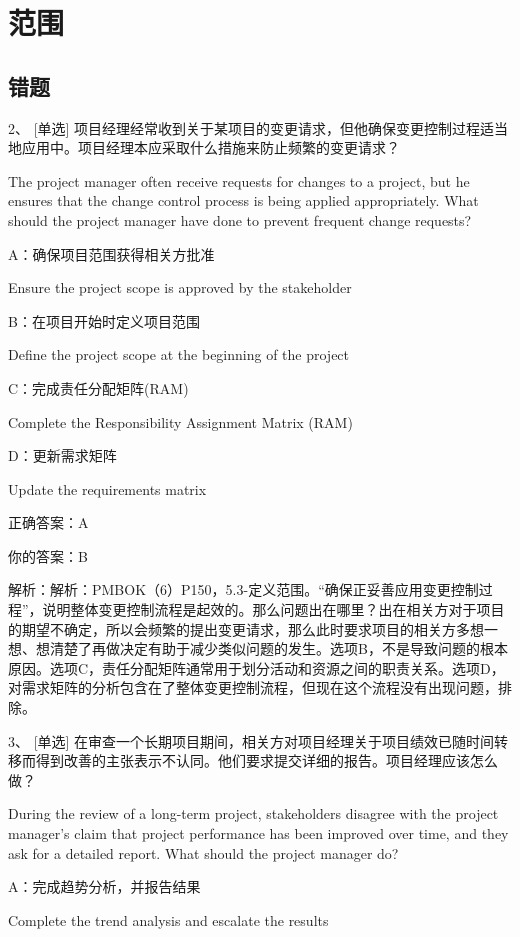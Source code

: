 
\chapter{范围}

\section{错题}

2、 [单选] 项目经理经常收到关于某项目的变更请求，但他确保变更控制过程适当地应用中。项目经理本应采取什么措施来防止频繁的变更请求？

The project manager often receive requests for changes to a project, but he ensures that the change control process is being applied appropriately. What should the project manager have done to prevent frequent change requests?

A：确保项目范围获得相关方批准

Ensure the project scope is approved by the stakeholder

B：在项目开始时定义项目范围

Define the project scope at the beginning of the project

C：完成责任分配矩阵(RAM)

Complete the Responsibility Assignment Matrix (RAM)

D：更新需求矩阵

Update the requirements matrix

正确答案：A

你的答案：B

解析：解析：PMBOK（6）P150，5.3-定义范围。“确保正妥善应用变更控制过程”，说明整体变更控制流程是起效的。那么问题出在哪里？出在相关方对于项目的期望不确定，所以会频繁的提出变更请求，那么此时要求项目的相关方多想一想、想清楚了再做决定有助于减少类似问题的发生。选项B，不是导致问题的根本原因。选项C，责任分配矩阵通常用于划分活动和资源之间的职责关系。选项D，对需求矩阵的分析包含在了整体变更控制流程，但现在这个流程没有出现问题，排除。


3、 [单选] 在审查一个长期项目期间，相关方对项目经理关于项目绩效已随时间转移而得到改善的主张表示不认同。他们要求提交详细的报告。项目经理应该怎么做？

During the review of a long-term project, stakeholders disagree with the project manager’s claim that project performance has been improved over time, and they ask for a detailed report. What should the project manager do?

A：完成趋势分析，并报告结果

Complete the trend analysis and escalate the results

